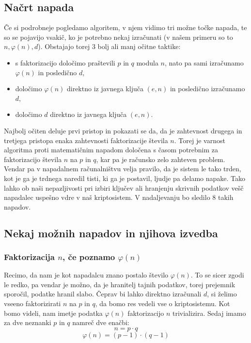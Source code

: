 \documentclass[a4paper, 12pt]{article} %
\begin{document}
\subsection{Načrt napada}

Če si podrobneje pogledamo algoritem, v njem vidimo tri možne točke napada, te so se pojavijo vsakič, ko je potrebno nekaj izračunati (v našem primeru so to $n, \varphi (n), d$). Obstajajo torej 3 bolj ali manj očitne taktike:
\begin{itemize}[label=]
\item s faktorizacijo določimo praštevili $p$ in $q$ modula $n$, nato pa sami izračunamo $\varphi (n)$ in posledično $d$,
\item določimo $\varphi (n)$ direktno iz javnega ključa $(e, n)$ in posledično izračunamo $d$,
\item določimo $d$ direktno iz javnega ključa $(e, n)$. \\
\end{itemize}

Najbolj očiten deluje prvi pristop in pokazati se da, da je zahtevnost drugega in tretjega pristopa enaka zahtevnosti faktorizacije števila $n$. Torej je varnost algoritma proti matematičnim napadom določena s časom potrebnim za faktorizacijo števila $n$ na $p$ in $q$, kar pa je računsko zelo zahteven problem.
\newline
\newline
Vendar pa v napadalnem računalništvu velja pravilo, da je sistem le tako trden, kot je ga je trdnega naredil tisti, ki ga je postavil, ljudje pa delamo napake. Tako lahko ob naši nepazljivosti pri izbiri ključev ali hranjenju skrivnih podatkov vešč napadalec uspešno vdre v naš kriptosistem. V nadaljevanju bo sledilo $8$ takih napadov.

\subsection{Nekaj možnih napadov in njihova izvedba}

\subsubsection{Faktorizacija $n$, če poznamo $\varphi (n)$}

Recimo, da nam je kot napadalcu znano postalo število $\varphi (n)$. To se sicer zgodi le redko, pa vendar je možno, da je hranitelj tajnih podatkov, torej prejemnik sporočil, podatke hranil slabo. Čeprav bi lahko direktno izračunali $d$, si želimo vseeno faktorizirati $n$ na $p$ in $q$, da bomo res vedeli vse o kriptosistemu. Kot bomo videli, nam imetje podatka $\varphi (n)$ faktorizacijo $n$ trivializira.
\newline
\newline
Sedaj imamo za dve neznanki $p$ in $q$ namreč dve enačbi: 
\begin{equation}
\label{eq:n}
n = p \cdot q
\end{equation}
\begin{equation}
\label{eq:phin}
\varphi (n) = (p-1) \cdot (q-1)
\end{equation}
\end{document}
